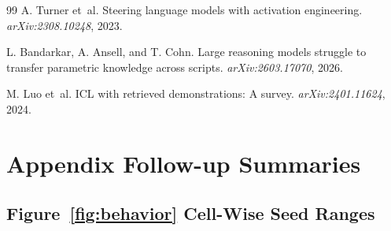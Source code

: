 \documentclass{article}
\begin{document}
\begin{thebibliography}{99}
A. Turner et~al. Steering language models with activation engineering. \emph{arXiv:2308.10248}, 2023.

L. Bandarkar, A. Ansell, and T. Cohn. Large reasoning models struggle to transfer parametric knowledge across scripts. \emph{arXiv:2603.17070}, 2026.

M. Luo et~al. ICL with retrieved demonstrations: A survey. \emph{arXiv:2401.11624}, 2024.

\end{thebibliography}

\clearpage
\appendix
\onecolumn
\setlength{\intextsep}{5pt plus 1pt minus 1pt}
\setlength{\abovecaptionskip}{4pt plus 1pt minus 1pt}
\setlength{\belowcaptionskip}{3pt plus 1pt minus 1pt}
\section{Appendix Follow-up Summaries}\label{app:followups}

\subsection{Figure~\ref{fig:behavior} Cell-Wise Seed Ranges}\label{app:behavior_seed_ranges}
\end{document}
